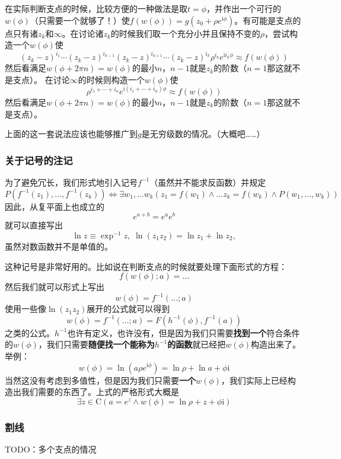 \documentclass[UTF8]{ctexart}
\begin{document}
在实际判断支点的时候，比较方便的一种做法是取$t=\phi$，并作出一个可行的$w(\phi)$（只需要一个就够了！）使$f(w(\phi))=g(z_0 + \rho e^{\mathrm{i}\phi})$。有可能是支点的点只有诸$z_k$和$\infty$。在讨论诸$z_k$的时候我们取一个充分小并且保持不变的$\rho$，尝试构造一个$w(\phi)$使
\[
(z_k - z)^{i_1} \cdots (z_k - z)^{i_{k-1}} (z_k - z)^{i_{k+1}} \cdots (z_k - z)^{i_k} \rho^{i_k} e^{\mathrm{i}i_k \phi} \approx f(w(\phi))
\]
然后看满足$w(\phi+2\pi n) = w(\phi)$的最小$n$，$n-1$就是$z_k$的阶数（$n=1$那这就不是支点）。
在讨论$\infty$的时候则构造一个$w(\phi)$使 \[
\rho^{i_1 + \cdots + i_n} e^{\mathrm{i}(i_1 + \cdots + i_n)\phi} \approx f(w(\phi))
\]
然后看满足$w(\phi+2\pi n) = w(\phi)$的最小$n$，$n-1$就是$z_k$的阶数（$n=1$那这就不是支点）。

上面的这一套说法应该也能够推广到$g$是无穷级数的情况。（大概吧\ldots{}\ldots{}）

\subsubsection{关于记号的注记}

为了避免冗长，我们形式地引入记号$f^{-1}$（虽然并不能求反函数）并规定
\[
P(f^{-1}(z_1), \ldots, f^{-1}(z_k)) \Leftrightarrow \exists w_1, \ldots w_k (z_1 = f(w_1) \land \ldots z_k = f(w_k) \land P(w_1, \ldots, w_k))
\] 因此，从复平面上也成立的 \[
e^{a+b} = e^a e^b
\] 就可以直接写出 \[
\ln z \equiv \exp^{-1} z, \; \ln (z_1 z_2) = \ln z_1 + \ln z_2,
\] 虽然对数函数并不是单值的。

这种记号是非常好用的。比如说在判断支点的时候就要处理下面形式的方程： \[
f(w(\phi);a) = \ldots
\] 然后我们就可以形式上写出 \[
w(\phi) = f^{-1}(\ldots;a) 
\] 使用一些像$\ln(z_1z_2)$展开的公式就可以得到 \[
w(\phi) = f^{-1}(\ldots;a) = F(h^{-1}(\phi), f^{-1}(a))
\]
之类的公式。$h^{-1}$也许有定义，也许没有，但是因为我们只需要\textbf{找到一个}符合条件的$w(\phi)$，我们只需要\textbf{随便找一个能称为$h^{-1}$的函数}就已经把$w(\phi)$构造出来了。举例：
\[
w(\phi) = \ln (a\rho e^{\mathrm{i}\phi}) = \ln \rho + \ln a + \phi \mathrm{i}
\]
当然这没有考虑到多值性，但是因为我们只需要\textbf{一个}$w(\phi)$，我们实际上已经构造出我们需要的东西了。上式的严格形式大概是
\[
\exists  z \in \mathrm{C} (a = e^z \land w(\phi) = \ln \rho + z + \phi \mathrm{i})
\]

\subsubsection{割线}

TODO：多个支点的情况 
\end{document}
